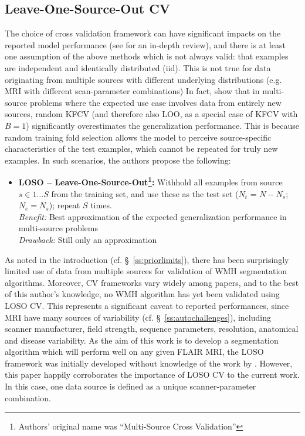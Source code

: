 \subsection{Leave-One-Source-Out CV}
The choice of cross validation framework can have significant impacts on the reported model performance (see \cite{Arlot2010} for an in-depth review), and there is at least one assumption of the above methods which is not always valid: that examples are independent and identically distributed (iid).
This is not true for data originating from multiple sources with different underlying distributions (e.g. MRI with different scan-parameter combinations) \cite{Geras2013}
In fact, \citeauthor{Geras2013} show that in multi-source problems where the expected use case involves data from entirely new sources, random KFCV (and therefore also LOO, as a special case of KFCV with $B=1$) significantly overestimates the generalization performance.
This is because random training fold selection allows the model to perceive source-specific characteristics of the test examples, which cannot be repeated for truly new examples.
In such scenarios, the authors propose the following:
\begin{itemize}
  \item \textbf{LOSO -- Leave-One-Source-Out\footnote{Authors' original name was ``Multi-Source Cross Validation''}:} Withhold all examples from source $s\in 1\dots S$ from the training set, and use these as the test set ($N_t$ = $N-N_s$; $N_e = N_s$); repeat $S$ times.
  \\\textit{Benefit:} Best approximation of the expected generalization performance in multi-source problems
  \\\textit{Drawback:} Still only an approximation
\end{itemize}
As noted in the introduction (cf. \S\ \ref{ss:priorlimits}), there has been surprisingly limited use of data from multiple sources for validation of WMH segmentation algorithms.
Moreover, CV frameworks vary widely among papers, and to the best of this author's knowledge, no WMH algorithm has yet been validated using LOSO CV.
This represents a significant caveat to reported performances, since MRI have many sources of variability (cf. \S\ \ref{ss:autochallenges}), including scanner manufacturer, field strength, sequence parameters, resolution, anatomical and disease variability.
As the aim of this work is to develop a segmentation algorithm which will perform well on any given FLAIR MRI, the LOSO framework was initially developed without knowledge of the work by \citeauthor{Geras2013}.
However, this paper happily corroborates the importance of LOSO CV to the current work.
In this case, one data source is defined as a unique scanner-parameter combination.
